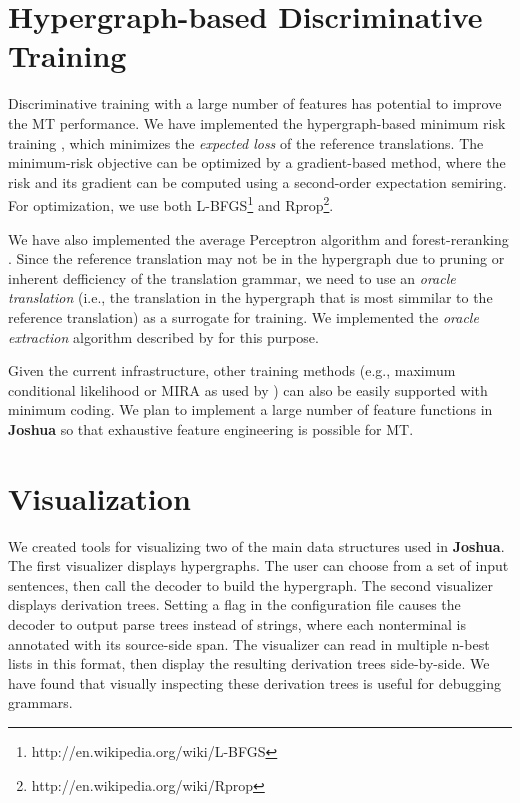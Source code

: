 \documentclass[11pt]{article}
\newcommand{\joshua}{\textbf{Joshua}\xspace}
\begin{document}
\section{Hypergraph-based Discriminative Training}

Discriminative training with a large number of features has 
potential to improve the MT performance.
We have implemented the hypergraph-based minimum risk training \cite{li-eisner:2009:EMNLP},
which minimizes the {\em expected loss} of the reference translations.
The minimum-risk objective can be optimized by a gradient-based method, where
the risk and its gradient can be computed using a second-order expectation semiring.
For optimization, we use both L-BFGS\footnote{http://en.wikipedia.org/wiki/L-BFGS} 
and Rprop\footnote{http://en.wikipedia.org/wiki/Rprop}.

We have also implemented the average Perceptron algorithm and forest-reranking \cite{zhifei-forest-reranking-galebook}.
Since the reference translation may not be in the hypergraph due to pruning or inherent
defficiency of the translation grammar, we need to use an {\em oracle translation} (i.e., the translation in
the hypergraph that is most simmilar to the reference translation) as a surrogate for training.
We implemented the {\em oracle extraction} algorithm described by 
for this purpose.

Given the current infrastructure, other training methods 
(e.g., maximum conditional likelihood or MIRA as used by )
can also be easily supported with minimum coding.
We plan to implement a large number of feature functions in \joshua so that exhaustive 
feature engineering is possible for MT.

\section{Visualization}

We created tools for visualizing two of the main data structures used
in \joshua \cite{PBML-2010-Joshua-visualization}. The first visualizer displays hypergraphs. The user can choose from
a set of input sentences, then call the decoder to build the hypergraph.
The second  visualizer displays derivation trees. Setting a flag in the configuration file causes the decoder to output parse trees instead of strings, where each nonterminal is annotated with its source-side
span. The visualizer can read in multiple n-best lists in this format, then
display the resulting derivation trees side-by-side. We have found that
visually inspecting these derivation trees is useful for debugging
grammars.
\end{document}
